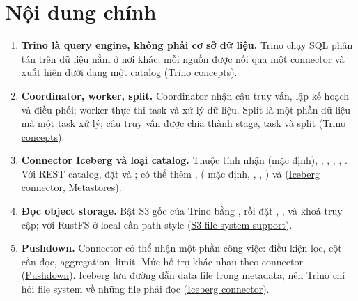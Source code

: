 \section{Nội dung chính}
\begin{enumerate}
  \item \textbf{Trino là query engine, không phải cơ sở dữ liệu.} Trino chạy SQL phân tán trên dữ liệu nằm ở nơi khác; mỗi nguồn được nối qua một connector và xuất hiện dưới dạng một catalog (\href{https://trino.io/docs/current/overview/concepts.html}{Trino concepts}).
  \item \textbf{Coordinator, worker, split.} Coordinator nhận câu truy vấn, lập kế hoạch và điều phối; worker thực thi task và xử lý dữ liệu. Split là một phần dữ liệu mà một task xử lý; câu truy vấn được chia thành stage, task và split (\href{https://trino.io/docs/current/overview/concepts.html}{Trino concepts}).
  \item \textbf{Connector Iceberg và loại catalog.} Thuộc tính  nhận  (mặc định), , , , , . Với REST catalog, đặt  và ; có thể thêm ,  ( mặc định, , , ) và  (\href{https://trino.io/docs/current/connector/iceberg.html}{Iceberg connector}, \href{https://trino.io/docs/current/object-storage/metastores.html}{Metastores}).
  \item \textbf{Đọc object storage.} Bật S3 gốc của Trino bằng , rồi đặt , ,  và khoá truy cập; với RustFS ở local cần path-style (\href{https://trino.io/docs/current/object-storage/file-system-s3.html}{S3 file system support}).
  \item \textbf{Pushdown.} Connector có thể nhận một phần công việc: điều kiện lọc, cột cần đọc, aggregation, limit. Mức hỗ trợ khác nhau theo connector (\href{https://trino.io/docs/current/optimizer/pushdown.html}{Pushdown}). Iceberg lưu đường dẫn data file trong metadata, nên Trino chỉ hỏi file system về những file phải đọc (\href{https://trino.io/docs/current/connector/iceberg.html}{Iceberg connector}).

\end{enumerate}

